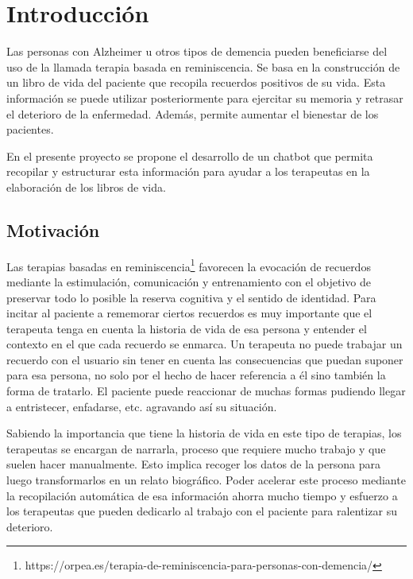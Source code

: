 \chapter{Introducción}
\label{cap:introduccion}



Las personas con Alzheimer u otros tipos de demencia pueden beneficiarse del uso de la llamada terapia basada en reminiscencia. Se basa en la construcción de un libro de vida del paciente que recopila recuerdos positivos de su vida. Esta información se puede utilizar posteriormente para ejercitar su memoria y retrasar el deterioro de la enfermedad. Además, permite aumentar el bienestar de los pacientes.

En el presente proyecto se propone el desarrollo de un chatbot que permita recopilar y estructurar esta información para ayudar a los terapeutas en la elaboración de los libros de vida.


\section{Motivación}

Las terapias basadas en reminiscencia\footnote{https://orpea.es/terapia-de-reminiscencia-para-personas-con-demencia/} favorecen la evocación de recuerdos mediante la estimulación, comunicación y entrenamiento con el objetivo de preservar todo lo posible la reserva cognitiva y el sentido de identidad. Para incitar al paciente a rememorar ciertos recuerdos es muy importante que el terapeuta tenga en cuenta la historia de vida de esa persona y entender el contexto en el que cada recuerdo se enmarca. Un terapeuta no puede trabajar un recuerdo con el usuario sin tener en cuenta las consecuencias que puedan suponer para esa persona, no solo por el hecho de hacer referencia a él sino también la forma de tratarlo. El paciente puede reaccionar de muchas formas pudiendo llegar a entristecer, enfadarse, etc. agravando así su situación.

Sabiendo la importancia que tiene la historia de vida en este tipo de terapias, los terapeutas se encargan de narrarla, proceso que requiere mucho trabajo y que suelen hacer manualmente. Esto implica recoger los datos de la persona para luego transformarlos en un relato biográfico. Poder acelerar este proceso mediante la recopilación automática de esa información ahorra mucho tiempo y esfuerzo a los terapeutas que pueden dedicarlo al trabajo con el paciente para ralentizar su deterioro.


